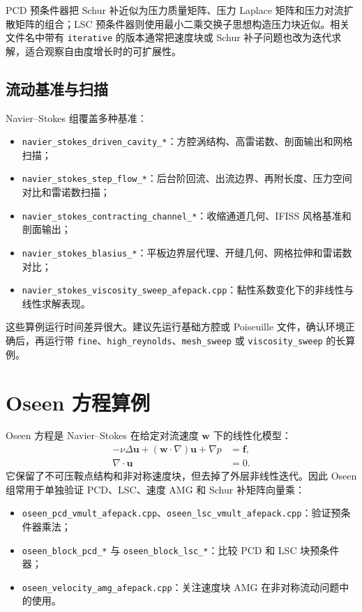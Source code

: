 \documentclass[UTF8,openany,zihao=-4,scheme=chinese]{ctexbook}
\newcommand{\file}[1]{\nolinkurl{#1}}
\begin{document}
PCD 预条件器把 Schur 补近似为压力质量矩阵、压力 Laplace 矩阵和压力对流扩散矩阵的组合；LSC 预条件器则使用最小二乘交换子思想构造压力块近似。相关文件名中带有 \file{iterative} 的版本通常把速度块或 Schur 补子问题也改为迭代求解，适合观察自由度增长时的可扩展性。

\subsection{流动基准与扫描}

Navier--Stokes 组覆盖多种基准：

\begin{itemize}[leftmargin=2em]
  \item \file{navier\_stokes\_driven\_cavity\_*}：方腔涡结构、高雷诺数、剖面输出和网格扫描；
  \item \file{navier\_stokes\_step\_flow\_*}：后台阶回流、出流边界、再附长度、压力空间对比和雷诺数扫描；
  \item \file{navier\_stokes\_contracting\_channel\_*}：收缩通道几何、IFISS 风格基准和剖面输出；
  \item \file{navier\_stokes\_blasius\_*}：平板边界层代理、开缝几何、网格拉伸和雷诺数对比；
  \item \file{navier\_stokes\_viscosity\_sweep\_afepack.cpp}：黏性系数变化下的非线性与线性求解表现。
\end{itemize}

这些算例运行时间差异很大。建议先运行基础方腔或 Poiseuille 文件，确认环境正确后，再运行带 \file{fine}、\file{high\_reynolds}、\file{mesh\_sweep} 或 \file{viscosity\_sweep} 的长算例。

\section{Oseen 方程算例}

Oseen 方程是 Navier--Stokes 在给定对流速度 $\boldsymbol w$ 下的线性化模型：
\[
\begin{aligned}
  -\nu\Delta\boldsymbol u
  +(\boldsymbol w\cdot\nabla)\boldsymbol u
  +\nabla p &= \boldsymbol f,\\
  \nabla\cdot\boldsymbol u &= 0.
\end{aligned}
\]
它保留了不可压鞍点结构和非对称速度块，但去掉了外层非线性迭代。因此 Oseen 组常用于单独验证 PCD、LSC、速度 AMG 和 Schur 补矩阵向量乘：

\begin{itemize}[leftmargin=2em]
  \item \file{oseen\_pcd\_vmult\_afepack.cpp}、\file{oseen\_lsc\_vmult\_afepack.cpp}：验证预条件器乘法；
  \item \file{oseen\_block\_pcd\_*} 与 \file{oseen\_block\_lsc\_*}：比较 PCD 和 LSC 块预条件器；
  \item \file{oseen\_velocity\_amg\_afepack.cpp}：关注速度块 AMG 在非对称流动问题中的使用。
\end{itemize}
\end{document}
